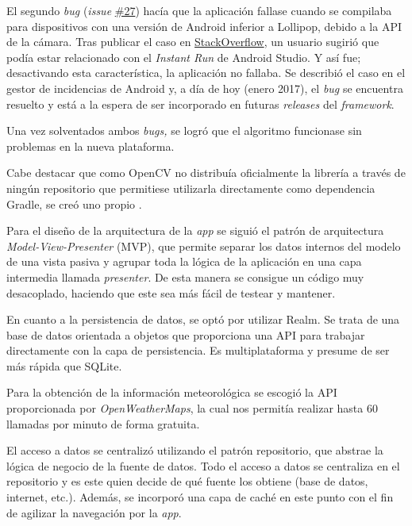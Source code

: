 El segundo \emph{bug} (\emph{issue}
\href{https://github.com/davidmigloz/go-bees/issues/27}{\#27}) hacía que
la aplicación fallase cuando se compilaba para dispositivos con una
versión de Android inferior a Lollipop, debido a la API de la cámara.
Tras publicar el caso en
\href{http://stackoverflow.com/questions/39770355/classnotfoundexception-android-hardware-camera2-cameraaccessexception-with-open}{StackOverflow},
un usuario sugirió que podía estar relacionado con el \emph{Instant Run}
de Android Studio. Y así fue; desactivando esta característica, la
aplicación no fallaba. Se describió el caso en el gestor de incidencias
de Android y, a día de hoy (enero 2017), el \emph{bug} se encuentra
resuelto y está a la espera de ser incorporado en futuras
\emph{releases} del \emph{framework}.

Una vez solventados ambos \emph{bugs,} se logró que el algoritmo
funcionase sin problemas en la nueva plataforma.

Cabe destacar que como OpenCV no distribuía oficialmente la librería a
través de ningún repositorio que permitiese utilizarla directamente como
dependencia Gradle, se creó uno propio \citep{gobees:prototipes}.

Para el diseño de la arquitectura de la \emph{app} se siguió el patrón
de arquitectura \emph{Model-View-Presenter} (MVP), que permite separar
los datos internos del modelo de una vista pasiva y agrupar toda la
lógica de la aplicación en una capa intermedia llamada \emph{presenter}.
De esta manera se consigue un código muy desacoplado, haciendo que este
sea más fácil de testear y mantener.

En cuanto a la persistencia de datos, se optó por utilizar Realm. Se
trata de una base de datos orientada a objetos que proporciona una API
para trabajar directamente con la capa de persistencia. Es
multiplataforma y presume de ser más rápida que SQLite.

Para la obtención de la información meteorológica se escogió la API
proporcionada por \emph{OpenWeatherMaps}, la cual nos permitía realizar
hasta 60 llamadas por minuto de forma gratuita.

El acceso a datos se centralizó utilizando el patrón repositorio, que
abstrae la lógica de negocio de la fuente de datos. Todo el acceso a
datos se centraliza en el repositorio y es este quien decide de qué
fuente los obtiene (base de datos, internet, etc.). Además, se incorporó
una capa de caché en este punto con el fin de agilizar la navegación por
la \emph{app}.

